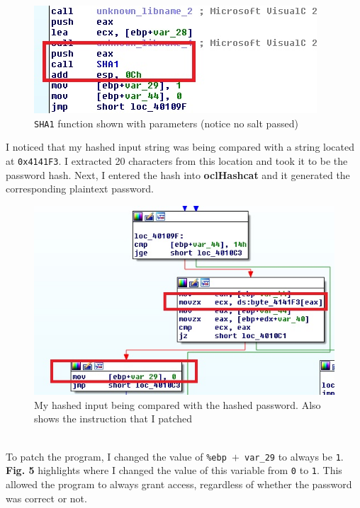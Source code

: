 \documentclass[conference]{IEEEtran}
\begin{document}
\begin{figure}[h]
\includegraphics[width=\columnwidth]{image4.jpg}
\caption{\texttt{SHA1} function shown with parameters (notice no salt passed)}
\centering
\end{figure}\mbox{}

I noticed that my hashed input string was being compared with a string located at \texttt{0x4141F3}. I extracted 20 characters from this location and took it to be the password hash. Next, I entered the hash into \textbf{oclHashcat} and it generated the corresponding plaintext password.\\

\begin{figure}[h]
\includegraphics[width=\columnwidth]{image5.jpg}
\caption{My hashed input being compared with the hashed password. Also shows the instruction that I patched}
\centering
\end{figure}\mbox{}\\

To patch the program, I changed the value of \texttt{\%ebp $+$ var\_29} to always be \texttt{1}. \textbf{Fig. 5} highlights where I changed the value of this variable from \texttt{0} to \texttt{1}. This allowed the program to always grant access, regardless of whether the password was correct or not.\\
\end{document}
